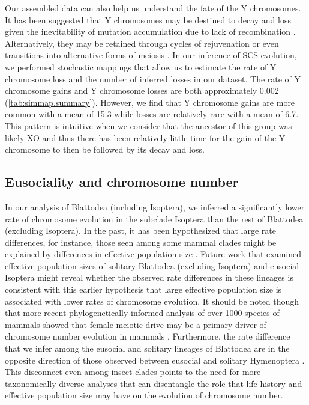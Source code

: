 Our assembled data can also help us understand the fate of the Y chromosomes. 
It has been suggested that Y chromosomes may be destined to decay and loss given the inevitability of mutation accumulation due to lack of recombination \citep{steinemann2005}.
Alternatively, they may be retained through cycles of rejuvenation or even transitions into alternative forms of meiosis \citep{blackmon2015bioessay}.
In our inference of SCS evolution, we performed stochastic mappings that allow us to estimate the rate of Y chromosome loss and the number of inferred losses in our dataset.
The rate of Y chromosome gains and Y chromosome losses are both approximately 0.002 (\cref{tab:simmap.summary}). 
However, we find that Y chromosome gains are more common with a mean of 15.3 while losses are relatively rare with a mean of 6.7.
This pattern is intuitive when we consider that the ancestor of this group was likely XO and thus there has been relatively little time for the gain of the Y chromosome to then be followed by its decay and loss.

\subsection{Eusociality and chromosome number}
In our analysis of Blattodea (including Isoptera), we inferred a significantly lower rate of chromosome evolution in the subclade Isoptera than the rest of Blattodea (excluding Isoptera).
In the past, it has been hypothesized that large rate differences, for instance, those seen among some mammal clades might be explained by differences in effective population size \citep{bush1977rapid}.
Future work that examined effective population sizes of solitary Blattodea (excluding Isoptera) and eusocial Isoptera might reveal whether the observed rate differences in these lineages is consistent with this earlier hypothesis that large effective population size is associated with lower rates of chromosome evolution.
It should be noted though that more recent phylogenetically informed analysis of over 1000 species of mammals showed that female meiotic drive may be a primary driver of chromosome number evolution in mammals \citep{blackmon2019meiotic}.
Furthermore, the rate difference that we infer among the eusocial and solitary lineages of Blattodea are in the opposite direction of those observed between eusocial and solitary Hymenoptera \citep{ross2015}.
This disconnect even among insect clades points to the need for more taxonomically diverse analyses that can disentangle the role that life history and effective population size may have on the evolution of chromosome number.

